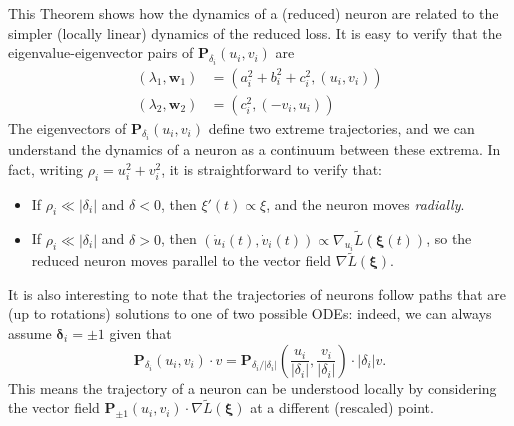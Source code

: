 

This Theorem shows how the dynamics of a (reduced) neuron are related to the simpler (locally linear) dynamics of the reduced loss. It is easy to verify that the eigenvalue-eigenvector pairs of $\bm P_{\delta_i}(u_i,v_i)$ are
\begin{align}
    (\lambda_1, \bm w_1) &= (a_i^2+ b_i^2 + c_i^2, (u_i,v_i))
    \label{eq:radial_eigenval}\\
    (\lambda_2, \bm w_2) &= (c_i^2, (-v_i,u_i)) 
    \label{eq:tangential_eigenval}
\end{align}
The eigenvectors of $\bm P_{\delta_i}(u_i,v_i)$ define two extreme trajectories, and we can understand the dynamics of a neuron as a continuum between these extrema. In fact, writing $\rho_i = u_i^2 + v_i^2$, it is straightforward to verify that:

\begin{itemize}
    \item If $\rho_i \ll |\delta_i|$ and $\delta < 0$, then $\xi'(t) \propto \xi$, and the neuron moves \emph{radially}.
    \item If $\rho_i \ll |\delta_i|$ and $\delta > 0$, then $(\dot u_i(t), \dot v_i(t)) \propto \nabla_{u_i} \tilde L(\bm \xi(t))$, so the reduced neuron moves parallel to the vector field $\nabla \tilde L(\bm \xi)$.
\end{itemize}
It is also interesting to note that the trajectories of neurons follow paths that are (up to rotations) solutions to one of two possible ODEs: indeed, we can always assume $\bm \delta_i = \pm 1$ given that
\begin{equation}
\bm P_{\delta_i}(u_i,v_i)\cdot v = \bm P_{\delta_i/|\delta_i|} \left(\frac{u_i}{|\delta_i|},\frac{v_i}{|\delta_i|}\right) \cdot |\delta_i|v.
\end{equation}
This means the trajectory of a neuron can be understood locally by considering the vector field $\bm P_{\pm 1}(u_i,v_i) \cdot \nabla \tilde{L}(\bm \xi)$ at a different (rescaled) point. 

